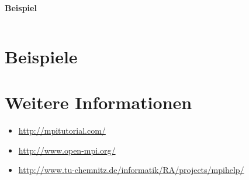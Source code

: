 \textbf{Beispiel}
\inputminted[numbersep=5pt, tabsize=4]{c}{scripts/mpi/mpi-reduce-example.c}

\section{Beispiele}
\section{Weitere Informationen}
\begin{itemize}
    \item \url{http://mpitutorial.com/}
    \item \url{http://www.open-mpi.org/}
    \item \url{http://www.tu-chemnitz.de/informatik/RA/projects/mpihelp/}
\end{itemize}

